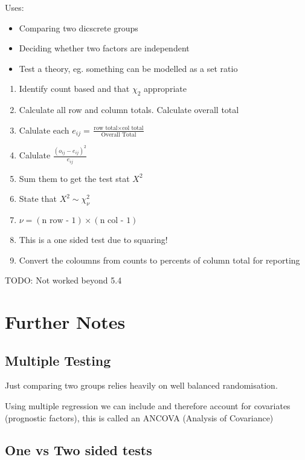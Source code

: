 \documentclass[
  letterpaper,
  DIV=11,
  numbers=noendperiod]{scrreprt}
\providecommand{\tightlist}{%
  \setlength{\itemsep}{0pt}\setlength{\parskip}{0pt}}\usepackage{longtable,booktabs,array}
\begin{document}
Uses:

\begin{itemize}
\tightlist
\item
  Comparing two dicscrete groups
\item
  Deciding whether two factors are independent
\item
  Test a theory, eg. something can be modelled as a set ratio
\end{itemize}

\begin{enumerate}
\def\labelenumi{\arabic{enumi})}
\tightlist
\item
  Identify count based and that \(\chi_2\) appropriate
\item
  Calculate all row and column totals. Calculate overall total
\item
  Calulate each
  \(e_{ij} = \frac{\text{row total}\times \text{col total}}{\text{Overall Total}}\)
\item
  Calulate \(\frac{(o_{ij}-e_{ij})^2}{e_{ij}}\)
\item
  Sum them to get the test stat \(X^2\)
\item
  State that \(X^2 \sim \chi^2_{\nu}\)
\item
  \(\nu = (\text{n row - 1})\times (\text{n col - 1})\)
\item
  This is a one sided test due to squaring!
\item
  Convert the coloumns from counts to percents of column total for
  reporting
\end{enumerate}

TODO: Not worked beyond 5.4

\hypertarget{further-notes}{%
\section{Further Notes}\label{further-notes}}

\hypertarget{multiple-testing}{%
\subsection{Multiple Testing}\label{multiple-testing}}

Just comparing two groups relies heavily on well balanced randomisation.

Using multiple regression we can include and therefore account for
covariates (prognostic factors), this is called an ANCOVA (Analysis of
Covariance)

\hypertarget{one-vs-two-sided-tests}{%
\subsection{One vs Two sided tests}\label{one-vs-two-sided-tests}}
\end{document}
